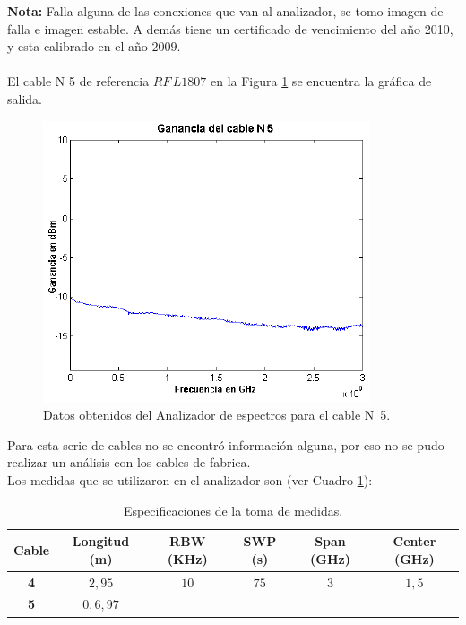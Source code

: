 \documentclass[12pt,graphicx,caption,rotating]{article}
\begin{document}
\noindent
\textbf{Nota:} Falla alguna de las conexiones que van al analizador, se tomo imagen de falla e imagen estable. A demás tiene un certificado de vencimiento del año 2010, y esta calibrado en el año $2009$.\\\\
El cable N 5 de referencia $RF\, L1807$ en la Figura \ref{fig7} se encuentra la gráfica de salida.
\begin{figure}[H]
	\centering
		\includegraphics[scale=0.6]{fig7.png}
	\caption{Datos obtenidos del Analizador de espectros para el cable N~5.}
	\label{fig7}
\end{figure}
\noindent
Para esta serie de cables no se encontró información alguna, por eso no se pudo realizar un análisis con los cables de fabrica.\\
Los medidas que se utilizaron en el analizador son (ver Cuadro \ref{tab3}):
\begin{table}[H]
  \centering
  \caption{Especificaciones de la toma de medidas.}
  \begin{tabular}{|c|c|c|c|c|c|}\hline
    \textbf{Cable } & \textbf{Longitud (m) } & \textbf{RBW (KHz) } & \textbf{SWP (s) } & \textbf{Span (GHz) } & \textbf{Center (GHz) } \\ \hline
    \textbf{4} & $2,95 $ & \multicolumn{ 1}{c|}{$10$} & \multicolumn{ 1}{c|}{$75$} & \multicolumn{ 1}{c|}{$3$} & \multicolumn{ 1}{c|}{$1,5 $} \\ \cline{ 1- 2}
    \textbf{5} & $0,6,97$ & \multicolumn{ 1}{c|}{} & \multicolumn{ 1}{c|}{} & \multicolumn{ 1}{c|}{} & \multicolumn{ 1}{c|}{} \\ \hline
  \end{tabular}
    \label{tab3}
\end{table}
\end{document}
